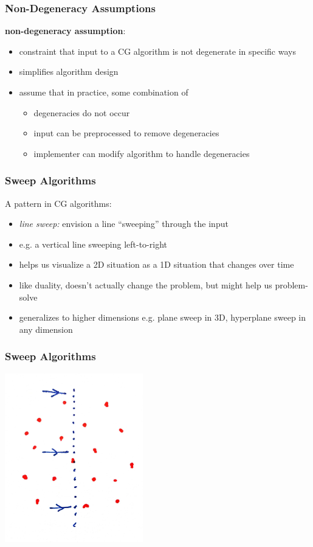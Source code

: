 \documentclass{beamer}
\begin{document}
\begin{frame} \frametitle{Non-Degeneracy Assumptions}
\textbf{non-degeneracy assumption}:
\begin{itemize}
  \item constraint that input to a CG algorithm is not degenerate in specific ways
  \item simplifies algorithm design
  \item assume that in practice, some combination of
  \begin{itemize}
    \item degeneracies do not occur
    \item input can be preprocessed to remove degeneracies
    \item implementer can modify algorithm to handle degeneracies
  \end{itemize}
\end{itemize}
\end{frame}

\begin{frame} \frametitle{Sweep Algorithms}
A pattern in CG algorithms:
\begin{itemize}
  \item \emph{line sweep:} envision a line ``sweeping'' through the input
  \item e.g. a vertical line sweeping left-to-right
  \item helps us visualize a 2D situation as a 1D situation that changes over
    time
  \item like duality, doesn't actually change the problem, but might help us
    problem-solve
  \item generalizes to higher dimensions e.g. plane sweep in 3D, hyperplane sweep
    in any dimension
\end{itemize}
\end{frame}

\begin{frame} \frametitle{Sweep Algorithms}
  \begin{center}
    \includegraphics[width=6cm]{line_sweep.jpg}
  \end{center}
\end{frame}
\end{document}

